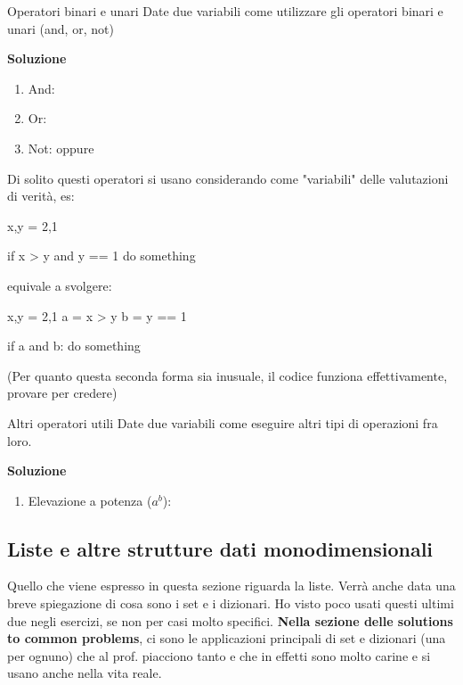 \documentclass[10pt]{extarticle}
\makeatletter
\newcommand{\<}{\langle}
\renewcommand{\>}{\rangle}
\renewenvironment{proof}[1][\proofname] {\par\pushQED{\qed}
\renewcommand*{\proofname}{Soluzione}
{\normalfont\sffamily\bfseries\topsep6\p@\@plus6\p@\relax #1\@addpunct{.} }}{\popQED\endtrivlist\@endpefalse}
\theoremstyle{mystyle}{\newtheorem*{remark}{Nota}}
\theoremstyle{mystyle}{\newtheorem*{remarks}{Note}}
\theoremstyle{mystyle}{\newtheorem*{example}{Esempio}}
\theoremstyle{mystyle}{\newtheorem*{examples}{Esempi}}
\theoremstyle{definition}{\newtheorem*{exercise}{Exercise}}
\theoremstyle{warn}
\makeatother
\begin{document}
\begin{definition}{Operatori binari e unari}{}
Date due variabili  come utilizzare gli operatori binari e unari (and, or, not)
\end{definition}
\begin{proof}
\begin{enumerate}
    \item And: 
    \item Or: 
    \item Not:  oppure 
\end{enumerate}
\end{proof}
\begin{remark}
Di solito questi operatori si usano considerando come "variabili" delle valutazioni di verità, es:
\begin{python}
x,y = 2,1

if x > y and y == 1
    do something
\end{python}
equivale a svolgere:
\begin{python}
x,y = 2,1
a = x > y
b = y == 1

if a and b:
    do something
\end{python}
(Per quanto questa seconda forma sia inusuale, il codice funziona effettivamente, provare per credere)
\end{remark}
\begin{definition}{Altri operatori utili}{}
Date due variabili  come eseguire altri tipi di operazioni fra loro.
\end{definition}
\begin{proof}
\begin{enumerate}
    \item Elevazione a potenza ($a^b$): 
\end{enumerate}
\end{proof}

\newpage
\subsection{Liste e altre strutture dati monodimensionali}
Quello che viene espresso in questa sezione riguarda la liste. Verrà anche data una breve spiegazione di cosa sono i set e i dizionari. Ho visto poco usati questi ultimi due negli esercizi, se non per casi molto specifici. \textbf{Nella sezione delle solutions to common problems}, ci sono le applicazioni principali di set e dizionari (una per ognuno) che al prof. piacciono tanto e che in effetti sono molto carine e si usano anche nella vita reale.
\end{document}
